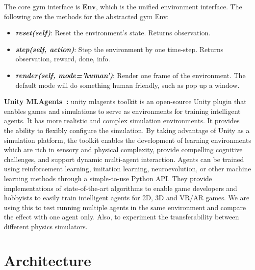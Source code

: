 The core gym interface is \textbf{Env}, which is the unified environment interface. 
The following are the methods for the abstracted gym Env:

\begin{itemize}
    \item \textit{\textbf{\colorbox{gray!20}{reset(self)}}}: Reset the environment's state. Returns observation.
    \item \textit{\textbf{\colorbox{gray!20}{step(self, action)}}}: Step the environment by one time-step. Returns observation, reward, done, info.
    \item \textit{\textbf{\colorbox{gray!20}{render(self, mode='human')}}}: Render one frame of the environment. The default mode will do something human friendly, such as pop up a window.
\end{itemize}

\textbf{Unity MLAgents~\parencite{juliani2018unity}: } unity mlagents toolkit is an open-source Unity plugin that enables games and simulations to serve as environments for training intelligent agents. It has more realistic and complex simulation environments. It provides the ability to flexibly configure
the simulation. By taking advantage of Unity as a simulation platform, the toolkit enables the development of learning environments which are rich in sensory and physical complexity, provide compelling cognitive challenges, and support dynamic multi-agent interaction. Agents can be trained using reinforcement learning, imitation learning, neuroevolution, or other machine learning methods through a simple-to-use Python API. They provide implementations of state-of-the-art algorithms to enable game developers and hobbyists to easily train intelligent agents for 2D, 3D and VR/AR games. We are using this to test running multiple agents in the same environment and compare the effect with one agent only. Also, to experiment the transferability between different physics simulators.

\section{Architecture}

